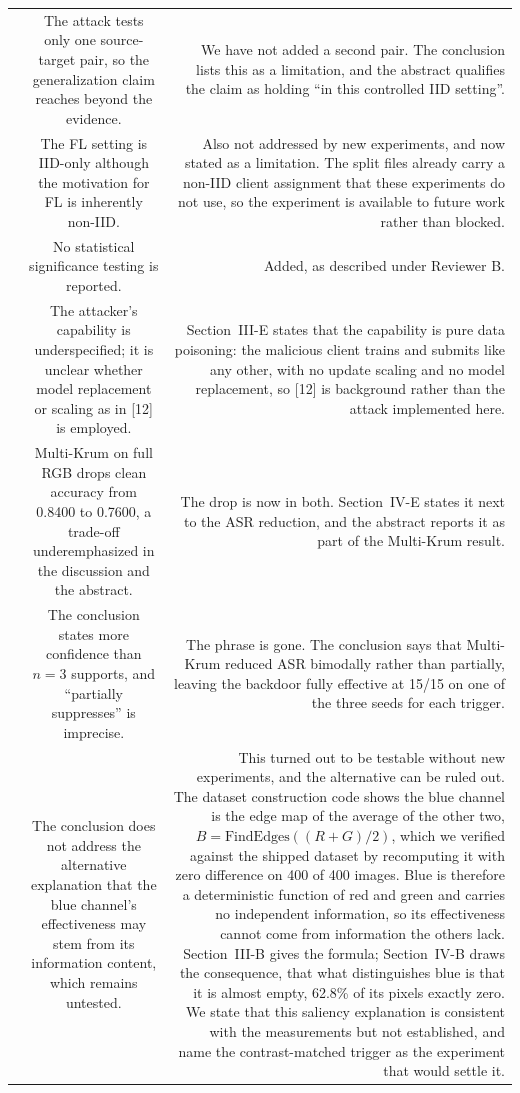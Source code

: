 \documentclass[11pt,a4paper]{article}
\newcounter{ptno}
\newcommand{\rownum}{\stepcounter{ptno}\theptno}
\begin{document}
\begin{longtable}{@{}NCR@{}}
\rownum &
The attack tests only one source-target pair, so the generalization claim reaches beyond the
evidence.
&
We have not added a second pair. The conclusion lists this as a limitation, and the abstract
qualifies the claim as holding ``in this controlled IID setting''. \\

\rownum &
The FL setting is IID-only although the motivation for FL is inherently non-IID.
&
Also not addressed by new experiments, and now stated as a limitation. The split files already carry
a non-IID client assignment that these experiments do not use, so the experiment is available to
future work rather than blocked. \\

\rownum &
No statistical significance testing is reported.
&
Added, as described under Reviewer B. \\

\rownum &
The attacker's capability is underspecified; it is unclear whether model replacement or scaling as in
[12] is employed.
&
Section~III-E states that the capability is pure data poisoning: the malicious client trains and
submits like any other, with no update scaling and no model replacement, so [12] is background rather
than the attack implemented here. \\

\rownum &
Multi-Krum on full RGB drops clean accuracy from 0.8400 to 0.7600, a trade-off underemphasized in the
discussion and the abstract.
&
The drop is now in both. Section~IV-E states it next to the ASR reduction, and the abstract reports
it as part of the Multi-Krum result. \\

\rownum &
The conclusion states more confidence than $n = 3$ supports, and ``partially suppresses'' is
imprecise.
&
The phrase is gone. The conclusion says that Multi-Krum reduced ASR bimodally rather than partially,
leaving the backdoor fully effective at 15/15 on one of the three seeds for each trigger. \\

\rownum &
The conclusion does not address the alternative explanation that the blue channel's effectiveness may
stem from its information content, which remains untested.
&
This turned out to be testable without new experiments, and the alternative can be ruled out. The
dataset construction code shows the blue channel is the edge map of the average of the other two,
$B = \mathrm{FindEdges}((R+G)/2)$, which we verified against the shipped dataset by recomputing it
with zero difference on 400 of 400 images. Blue is therefore a deterministic function of red and
green and carries no independent information, so its effectiveness cannot come from information the
others lack. Section~III-B gives the formula; Section~IV-B draws the consequence, that what
distinguishes blue is that it is almost empty, 62.8\% of its pixels exactly zero. We state that this
saliency explanation is consistent with the measurements but not established, and name the
contrast-matched trigger as the experiment that would settle it. \\


\end{longtable}
\end{document}
